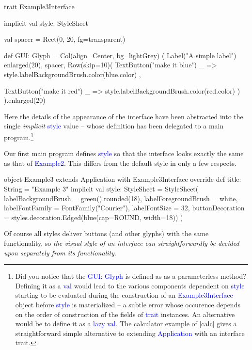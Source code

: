 \documentclass[12pt,a4paper]{article}
\def\Scala#1{\textcolor{blue}{\textsf{#1}}}
\begin{document}
\begin{scala}
trait Example3Interface {
  implicit val style: StyleSheet

  val spacer = Rect(0, 20, fg=transparent)

  def GUI: Glyph = Col(align=Center, bg=lightGrey) (
    Label("A simple label") enlarged(20),
    spacer,
    Row(skip=10)(
      TextButton("make it blue")
      { _ => style.labelBackgroundBrush.color(blue.color) },

      TextButton("make it red")
      { _ => style.labelBackgroundBrush.color(red.color) }
    )
  ).enlarged(20)

}
\end{scala}

Here the details of the appearance of the interface have been
abstracted into the single \textit{implicit } \Scala{style} value
-- whose definition has been delegated to a main program.\footnote{
Did you notice that the  \Scala{GUI: Glyph} is defined as as a
parameterless method?  Defining it as a \Scala{val} would lead
to the various components dependent on \Scala{style} starting to be evaluated
during the construction of an \Scala{Example3Interface} object
before \Scala{style} is materialized -- a subtle error
whose occurence depends on the order of construction of
the fields of \Scala{trait} instances. An alternative would be
to define it as a \Scala {lazy val}. The calculator example of \ref{calc} gives
a straightforward simple alternative to extending \Scala{Application} with
an interface trait.}

\begin{center}
\end{center}

Our first main program defines \Scala{style} so that the
interface looks exactly the same as that of \Scala{Example2}.
This differs from the default style in only a few respects.
\begin{scala}
object Example3 extends Application with Example3Interface  {
    override def title: String = "Example 3"
    implicit val style: StyleSheet = StyleSheet(
      labelBackgroundBrush  = green().rounded(18),
      labelForegroundBrush  = white,
      labelFontFamily       = FontFamily("Courier"),
      labelFontSize         = 32,
      buttonDecoration = styles.decoration.Edged(blue(cap=ROUND, width=18))
    )
}
\end{scala}

Of course all styles deliver buttons (and other glyphs) with the
same functionality, so \textit{ the  visual style of an interface can
straightforwardly be decided upon separately from its functionality}.
\end{document}
